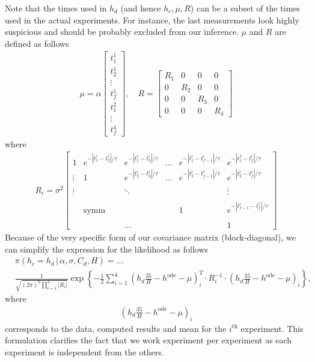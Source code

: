 \documentclass{article}
\begin{document}
Note that the times used in $h_d$ (and hence $h_c, \mu, R$) can be a
subset of the times used in the actual experiments. For instance, the
last measurements look highly suspicious and should be probably excluded
from our inference. 
$\mu$ and $R$ are defined as follows 
\begin{align*}
 \mu = \alpha
 \begin{bmatrix}
  t_1^1 \\
  t_2^1 \\
  \vdots \\
  t_f^1 \\
  t_1^2 \\
  \vdots \\
  t_f^4
 \end{bmatrix}, \quad R = 
 \begin{bmatrix}
  R_1 & 0 & 0 & 0 \\
  0 & R_2 & 0 & 0 \\
  0 & 0 & R_3 & 0 \\ 
  0 & 0 & 0 & R_4
 \end{bmatrix}
\end{align*}
where
\begin{align*}
 R_i = \sigma^2
 \begin{bmatrix}
  1 & e^{-|t_1^i - t_2^i|/\tau} & e^{-|t_1^i - t_3^i|/\tau} &  \ldots & e^{-|t_1^i - t_{f-1}^i|/\tau} & e^{-|t_1^1-t_f^i|/\tau} \\
\vdots & 1 & e^{-|t_2^i - t_3^i|/\tau} &   \ldots & e^{-|t_2^i - t_{f-1}^i|/\tau} & e^{-|t_2^i - t_f^i|/\tau} \\
\\
\vdots &  &  \ddots & &  & \vdots \\
\\
& \text{symm} & & & 1 & e^{-|t_{f-1}^i - t_f^i|/\tau}  \\
\\
& & \ldots & & & 1
 \end{bmatrix}
\end{align*}
Because of the very specific form of our covariance matrix (block-diagonal), we can simplify the expression for the likelihood as follows
\begin{align*}
 & \pi(h_c = h_d \, | \, \alpha, \sigma, C_d, H) =  \ldots \\
 & \frac1{\sqrt{(2\pi)^n \prod_{i=1}^4|R_i|}}  \exp \left\{ - \frac12 \sum_{i=1}^4 \left(  h_d \frac{35}H - h^\text{ode} - \mu \right)_i^T \cdotp R_i^{-1} \cdotp \left(  h_d \frac{35}H - h^\text{ode} - \mu \right)_i \right\} ,
\end{align*}
where 
\begin{align*}
 \left(  h_d \frac{35}H - h^\text{ode} - \mu \right)_i
\end{align*}
corresponds to the data, computed results and mean for the $i^\text{th}$ experiment. This formulation clarifies the fact that we work experiment per experiment as each experiment is independent from the others.
\end{document}
